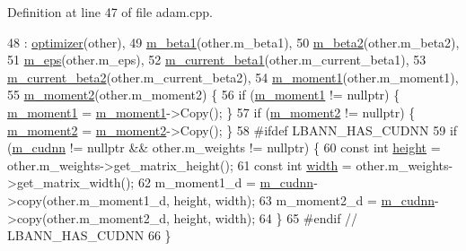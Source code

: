 Definition at line 47 of file adam.\+cpp.


\begin{DoxyCode}
48   : \hyperlink{classlbann_1_1optimizer_a136ed79c3f279ecded5be380fb67b05f}{optimizer}(other),
49     \hyperlink{classlbann_1_1adam_a73af15a28066edbfad9ba6a900746a19}{m\_beta1}(other.m\_beta1),
50     \hyperlink{classlbann_1_1adam_ab1f2a16b8eb7e265895ea9eef3fe87b2}{m\_beta2}(other.m\_beta2),
51     \hyperlink{classlbann_1_1adam_a751102f0fd866612f5685050a08020a9}{m\_eps}(other.m\_eps),
52     \hyperlink{classlbann_1_1adam_a53c3034e187da2720447bbb4f2b59a5d}{m\_current\_beta1}(other.m\_current\_beta1),
53     \hyperlink{classlbann_1_1adam_ad38376b684d69d4a15da1d11f8808ca7}{m\_current\_beta2}(other.m\_current\_beta2),
54     \hyperlink{classlbann_1_1adam_aa10a518a5356257bc69e655b88b0ed67}{m\_moment1}(other.m\_moment1),
55     \hyperlink{classlbann_1_1adam_aea3295a0ee7da5e9c56fd6ff2f05c63f}{m\_moment2}(other.m\_moment2) \{
56   \textcolor{keywordflow}{if} (\hyperlink{classlbann_1_1adam_aa10a518a5356257bc69e655b88b0ed67}{m\_moment1} != \textcolor{keyword}{nullptr}) \{ \hyperlink{classlbann_1_1adam_aa10a518a5356257bc69e655b88b0ed67}{m\_moment1} = \hyperlink{classlbann_1_1adam_aa10a518a5356257bc69e655b88b0ed67}{m\_moment1}->Copy(); \}
57   \textcolor{keywordflow}{if} (\hyperlink{classlbann_1_1adam_aea3295a0ee7da5e9c56fd6ff2f05c63f}{m\_moment2} != \textcolor{keyword}{nullptr}) \{ \hyperlink{classlbann_1_1adam_aea3295a0ee7da5e9c56fd6ff2f05c63f}{m\_moment2} = \hyperlink{classlbann_1_1adam_aea3295a0ee7da5e9c56fd6ff2f05c63f}{m\_moment2}->Copy(); \}
58 \textcolor{preprocessor}{  #ifdef LBANN\_HAS\_CUDNN}
59   \textcolor{keywordflow}{if} (\hyperlink{classlbann_1_1optimizer_a2f24dbeaca18b06f4aa7d179bbf96680}{m\_cudnn} != \textcolor{keyword}{nullptr} && other.m\_weights != \textcolor{keyword}{nullptr}) \{
60     \textcolor{keyword}{const} \textcolor{keywordtype}{int} \hyperlink{structlayer__header_ad986e4b92e5b455e066fd349725c6bd9}{height} = other.m\_weights->get\_matrix\_height();
61     \textcolor{keyword}{const} \textcolor{keywordtype}{int} \hyperlink{structlayer__header_af1f45c9c74db048ea424114418f22d50}{width} = other.m\_weights->get\_matrix\_width();
62     m\_moment1\_d = \hyperlink{classlbann_1_1optimizer_a2f24dbeaca18b06f4aa7d179bbf96680}{m\_cudnn}->copy(other.m\_moment1\_d, height, width);
63     m\_moment2\_d = \hyperlink{classlbann_1_1optimizer_a2f24dbeaca18b06f4aa7d179bbf96680}{m\_cudnn}->copy(other.m\_moment2\_d, height, width);
64   \}
65 \textcolor{preprocessor}{  #endif // LBANN\_HAS\_CUDNN}
66 \}
\end{DoxyCode}
